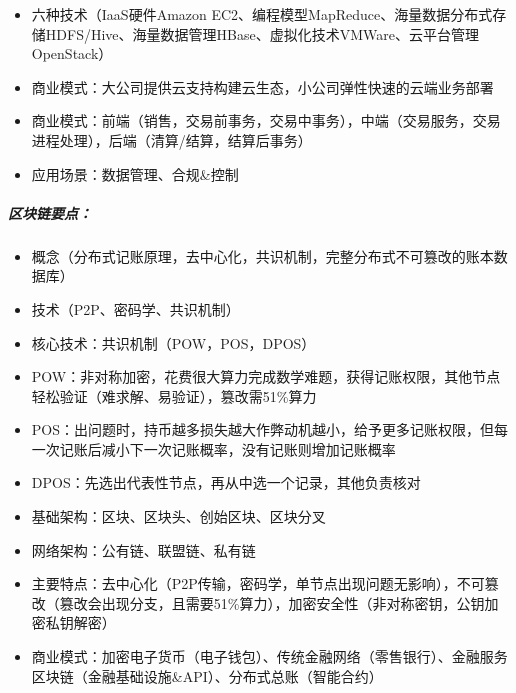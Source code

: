 \documentclass[letterpaper,11pt,english]{sphinxmanual}
\begin{document}
\begin{center}
{{\begin{itemize}
\item {} 
六种技术（IaaS硬件Amazon
EC2、编程模型MapReduce、海量数据分布式存储HDFS/Hive、海量数据管理HBase、虚拟化技术VMWare、云平台管理OpenStack）

\item {} 
商业模式：大公司提供云支持构建云生态，小公司弹性快速的云端业务部署

\item {} 
商业模式：前端（销售，交易前事务，交易中事务），中端（交易服务，交易进程处理），后端（清算/结算，结算后事务）

\item {} 
应用场景：数据管理、合规\&控制

\end{itemize}


\subparagraph{区块链要点：}
\label{\detokenize{chapter_AI+Finance/FinTech:id13}}\begin{itemize}
\item {} 
概念（分布式记账原理，去中心化，共识机制，完整分布式不可篡改的账本数据库）

\item {} 
技术（P2P、密码学、共识机制）

\item {} 
核心技术：共识机制（POW，POS，DPOS）

\item {} 
POW：非对称加密，花费很大算力完成数学难题，获得记账权限，其他节点轻松验证（难求解、易验证），篡改需51\%算力

\item {} 
POS：出问题时，持币越多损失越大作弊动机越小，给予更多记账权限，但每一次记账后减小下一次记账概率，没有记账则增加记账概率

\item {} 
DPOS：先选出代表性节点，再从中选一个记录，其他负责核对

\item {} 
基础架构：区块、区块头、创始区块、区块分叉

\item {} 
网络架构：公有链、联盟链、私有链

\item {} 
主要特点：去中心化（P2P传输，密码学，单节点出现问题无影响），不可篡改（篡改会出现分支，且需要51\%算力），加密安全性（非对称密钥，公钥加密私钥解密）

\item {} 
商业模式：加密电子货币（电子钱包）、传统金融网络（零售银行）、金融服务区块链（金融基础设施\&API）、分布式总账（智能合约）


\end{itemize}}}
\end{center}
\end{document}
